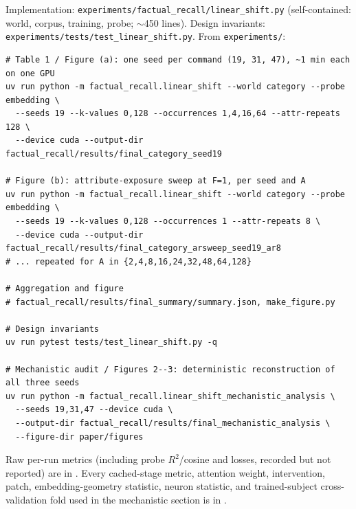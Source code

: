 \documentclass[11pt]{article}
\begin{document}
Implementation: \texttt{experiments/factual\_recall/linear\_shift.py} (self-contained: world, corpus, training, probe; $\sim$450 lines). Design invariants: \texttt{experiments/tests/test\_linear\_shift.py}. From \texttt{experiments/}:

\begin{small}
\begin{verbatim}
# Table 1 / Figure (a): one seed per command (19, 31, 47), ~1 min each on one GPU
uv run python -m factual_recall.linear_shift --world category --probe embedding \
  --seeds 19 --k-values 0,128 --occurrences 1,4,16,64 --attr-repeats 128 \
  --device cuda --output-dir factual_recall/results/final_category_seed19

# Figure (b): attribute-exposure sweep at F=1, per seed and A
uv run python -m factual_recall.linear_shift --world category --probe embedding \
  --seeds 19 --k-values 0,128 --occurrences 1 --attr-repeats 8 \
  --device cuda --output-dir factual_recall/results/final_category_arsweep_seed19_ar8
# ... repeated for A in {2,4,8,16,24,32,48,64,128}

# Aggregation and figure
# factual_recall/results/final_summary/summary.json, make_figure.py

# Design invariants
uv run pytest tests/test_linear_shift.py -q

# Mechanistic audit / Figures 2--3: deterministic reconstruction of all three seeds
uv run python -m factual_recall.linear_shift_mechanistic_analysis \
  --seeds 19,31,47 --device cuda \
  --output-dir factual_recall/results/final_mechanistic_analysis \
  --figure-dir paper/figures
\end{verbatim}
\end{small}

Raw per-run metrics (including probe $R^2$/cosine and losses, recorded but not reported) are in
.
Every cached-stage metric, attention weight, intervention, patch, embedding-geometry statistic, neuron statistic, and trained-subject cross-validation fold used in the mechanistic section is in
.
\end{document}

